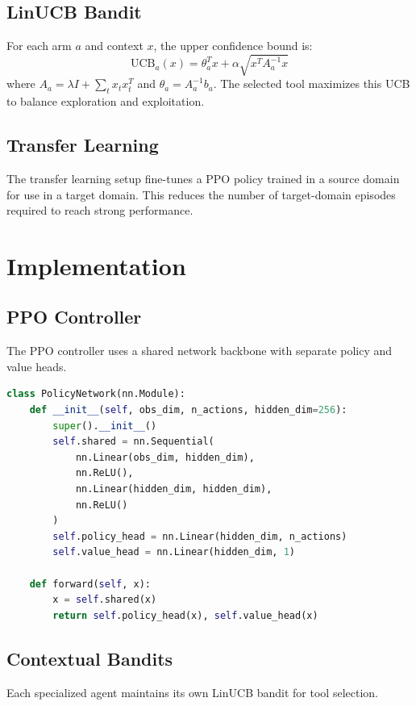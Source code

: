 \documentclass[11pt,a4paper]{article}
\begin{document}
\subsection{LinUCB Bandit}
For each arm $a$ and context $x$, the upper confidence bound is:
\begin{equation}
\text{UCB}_a(x) = \theta_a^T x + \alpha \sqrt{x^T A_a^{-1} x}
\end{equation}
where $A_a = \lambda I + \sum_{t} x_t x_t^T$ and $\theta_a = A_a^{-1} b_a$.
The selected tool maximizes this UCB to balance exploration and exploitation.

\subsection{Transfer Learning}
The transfer learning setup fine-tunes a PPO policy trained in a source domain for use in a target domain. This reduces the number of target-domain episodes required to reach strong performance.

\section{Implementation}
\subsection{PPO Controller}
The PPO controller uses a shared network backbone with separate policy and value heads.

\begin{lstlisting}[language=Python, caption={PPO policy network architecture.}]
class PolicyNetwork(nn.Module):
    def __init__(self, obs_dim, n_actions, hidden_dim=256):
        super().__init__()
        self.shared = nn.Sequential(
            nn.Linear(obs_dim, hidden_dim),
            nn.ReLU(),
            nn.Linear(hidden_dim, hidden_dim),
            nn.ReLU()
        )
        self.policy_head = nn.Linear(hidden_dim, n_actions)
        self.value_head = nn.Linear(hidden_dim, 1)

    def forward(self, x):
        x = self.shared(x)
        return self.policy_head(x), self.value_head(x)
\end{lstlisting}

\subsection{Contextual Bandits}
Each specialized agent maintains its own LinUCB bandit for tool selection.
\end{document}
